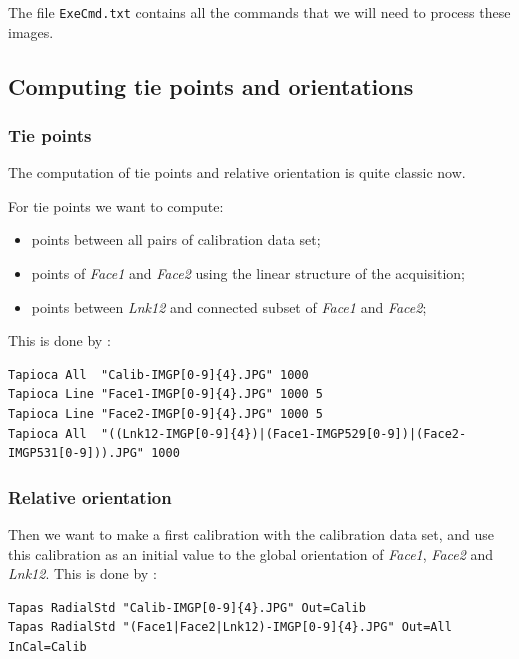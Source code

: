 The file {\tt  ExeCmd.txt} contains all the commands that we will need to process these images.



\subsection{Computing tie points and orientations}


\subsubsection{Tie points}

The computation of tie points and relative orientation is quite
classic now.

For tie points we want to compute:

\begin{itemize}
   \item  points  between all pairs of calibration data set;
   \item  points  of \emph{Face1} and \emph{Face2} using the linear structure of
          the acquisition;
   \item  points  between \emph{Lnk12} and connected subset of  \emph{Face1} and \emph{Face2};
\end{itemize}

This is done by :

\begin{verbatim}
Tapioca All  "Calib-IMGP[0-9]{4}.JPG" 1000
Tapioca Line "Face1-IMGP[0-9]{4}.JPG" 1000 5
Tapioca Line "Face2-IMGP[0-9]{4}.JPG" 1000 5
Tapioca All  "((Lnk12-IMGP[0-9]{4})|(Face1-IMGP529[0-9])|(Face2-IMGP531[0-9])).JPG" 1000
\end{verbatim}


\subsubsection{Relative orientation}

Then we want to make a first calibration with the calibration data set, and
use this calibration as an initial value to the global orientation of
\emph{Face1},  \emph{Face2} and \emph{Lnk12}. This is done by :

\begin{verbatim}
Tapas RadialStd "Calib-IMGP[0-9]{4}.JPG" Out=Calib
Tapas RadialStd "(Face1|Face2|Lnk12)-IMGP[0-9]{4}.JPG" Out=All InCal=Calib
\end{verbatim}

